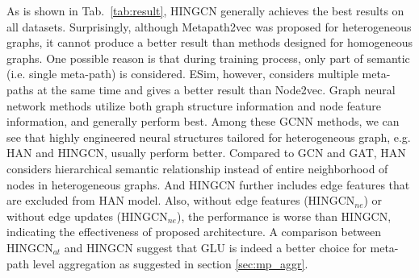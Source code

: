 As is shown in Tab.~\ref{tab:result}, HINGCN generally achieves the best results on all datasets.
Surprisingly, although Metapath2vec was proposed for heterogeneous graphs, it cannot produce a better result than methods designed for homogeneous graphs. One possible reason is that during training process, only part of semantic (i.e. single meta-path) is considered. ESim, however, considers multiple meta-paths at the same time and gives a better result than Node2vec. Graph neural network methods utilize both graph structure information and node feature information, and generally perform best. Among  these GCNN methods, we can see that highly engineered neural structures tailored for heterogeneous graph, e.g. HAN and HINGCN, usually perform better. Compared to GCN and GAT, HAN considers hierarchical semantic relationship instead of entire neighborhood of nodes in heterogeneous graphs. And HINGCN further includes edge features that are excluded from HAN model. Also, without edge features (HINGCN$_{ne}$) or without edge updates (HINGCN$_{ne}$), the performance is worse than HINGCN, indicating the effectiveness of proposed architecture. A comparison between HINGCN$_{at}$ and HINGCN suggest that GLU is indeed a better choice for meta-path level aggregation as suggested in section \ref{sec:mp_aggr}.

